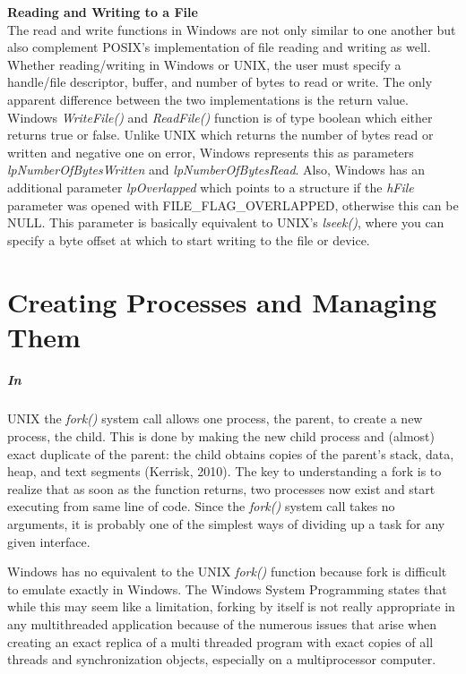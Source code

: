 \documentclass[11pt]{report}
\begin{document}
\textbf{\large Reading and Writing to a File}\\
The read and write functions in Windows are not only similar to one another but also complement POSIX’s implementation of file reading and writing as well. Whether reading/writing in Windows or UNIX, the user must specify a handle/file descriptor, buffer, and number of bytes to read or write. The only apparent difference between the two implementations is the return value. Windows \textit{WriteFile()} and \textit{ReadFile()} function is of type boolean which either returns true or false. Unlike UNIX which returns the number of bytes read or written and negative one on error, Windows represents this as parameters \textit{lpNumberOfBytesWritten} and \textit{lpNumberOfBytesRead}. Also, Windows has an additional parameter \textit{lpOverlapped} which points to a structure if the \textit{hFile} parameter was opened with FILE\_FLAG\_OVERLAPPED, otherwise this can be NULL. This parameter is basically equivalent to UNIX's \textit{lseek()}, where you can specify a byte offset at which to start writing to the file or device.

\chapter{Creating Processes and Managing Them}
\paragraph{In} UNIX the \textit{fork()} system call allows one process, the parent, to create a new process, the child. This is done by making the new child process and (almost) exact duplicate of the parent: the child obtains copies of the parent’s stack, data, heap, and text segments (Kerrisk, 2010). The key to understanding a fork is to realize that as soon as the function returns, two processes now exist and start executing from same line of code. Since the \textit{fork()} system call takes no arguments, it is probably one of the simplest ways of dividing up a task for any given interface.

Windows has no equivalent to the UNIX \textit{fork()} function because fork is difficult to emulate exactly in Windows. The Windows System Programming states that while this may seem like a limitation, forking by itself is not really appropriate in any multithreaded application because of the numerous issues that arise when creating an exact replica of a multi threaded program with exact copies of all threads and synchronization objects, especially on a multiprocessor computer. 
\end{document}
